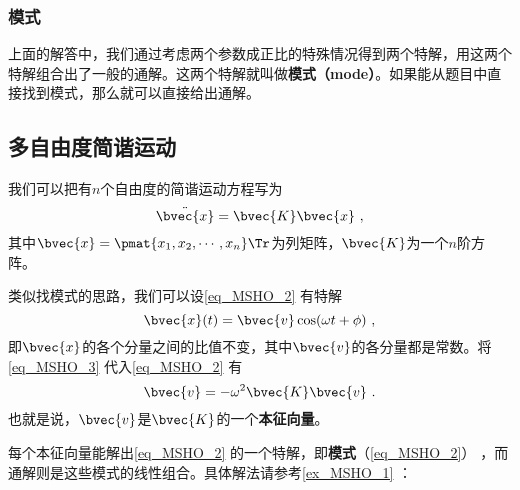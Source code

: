 \subsubsection{模式}

上面的解答中，我们通过考虑两个参数成正比的特殊情况得到两个特解，用这两个特解组合出了一般的通解。这两个特解就叫做\textbf{模式（mode）}。如果能从题目中直接找到模式，那么就可以直接给出通解。




\subsection{多自由度简谐运动}

我们可以把有$n$个自由度的简谐运动方程写为
\begin{equation}\label{eq_MSHO_2}
\ddot{\bvec{x}} = \bvec{K}\bvec{x}~,
\end{equation}
其中$\bvec{x}=\pmat{x_1, x_2, \cdots, x_n}\Tr$为列矩阵，$\bvec{K}$为一个$n$阶方阵。

类似找模式的思路，我们可以设\autoref{eq_MSHO_2} 有特解
\begin{equation}\label{eq_MSHO_3}
\bvec{x}(t) = \bvec{v}\cos(\omega t + \phi)~,
\end{equation}
即$\bvec{x}$的各个分量之间的比值不变，其中$\bvec{v}$的各分量都是常数。将\autoref{eq_MSHO_3} 代入\autoref{eq_MSHO_2} 有
\begin{equation}\label{eq_MSHO_5}
\bvec{v} = -\omega^2\bvec{K}\bvec{v}~.
\end{equation}
也就是说，$\bvec{v}$是$\bvec{K}$的一个\textbf{本征向量}。

每个本征向量能解出\autoref{eq_MSHO_2} 的一个特解，即\textbf{模式}（\autoref{eq_MSHO_2}） ，而通解则是这些模式的线性组合。具体解法请参考\autoref{ex_MSHO_1} ：






